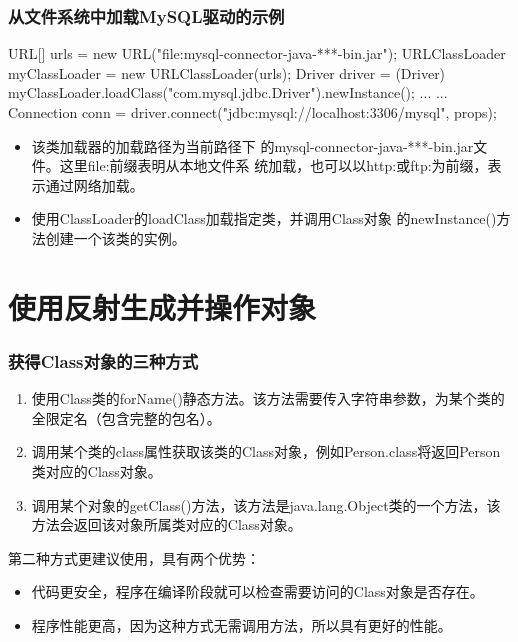 \documentclass[hyperref={pdfpagelabels=false},compress,table]{beamer} %
\newcommand{\kai}{\CJKfamily{KaiTi}}
\begin{document}
\begin{frame}[fragile] %
\frametitle{从文件系统中加载MySQL驱动的示例}

\begin{javaCode}
URL[] urls = {new URL("file:mysql-connector-java-***-bin.jar")};
URLClassLoader myClassLoader = new URLClassLoader(urls);
Driver driver = (Driver) myClassLoader.loadClass("com.mysql.jdbc.Driver").newInstance();
... ...
Connection conn = driver.connect("jdbc:mysql://localhost:3306/mysql", props);
\end{javaCode}

\begin{itemize}\kai
\item 该类加载器的加载路径为当前路径下
  的mysql-connector-java-***-bin.jar文件。这里file:前缀表明从本地文件系
  统加载，也可以以http:或ftp:为前缀，表示通过网络加载。
\item 使用ClassLoader的loadClass加载指定类，并调用Class对象
  的newInstance()方法创建一个该类的实例。
\end{itemize}
\end{frame}




\section{使用反射生成并操作对象}

\begin{frame}[fragile] %
\frametitle{获得Class对象的三种方式}

\begin{enumerate}
\item 使用Class类的forName()静态方法。该方法需要传入字符串参数，为某个类的全限定名（包含完整的包名）。
\item 调用某个类的class属性获取该类的Class对象，例如Person.class将返回Person类对应的Class对象。
\item 调用某个对象的getClass()方法，该方法是java.lang.Object类的一个方法，该方法会返回该对象所属类对应的Class对象。
\end{enumerate}

第二种方式更建议使用，具有两个优势：
\begin{itemize}\kai
\item 代码更安全，程序在编译阶段就可以检查需要访问的Class对象是否存在。
\item 程序性能更高，因为这种方式无需调用方法，所以具有更好的性能。
\end{itemize}
\end{frame}
\end{document}
